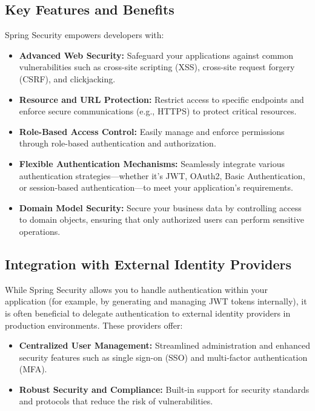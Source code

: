 \subsection*{Key Features and Benefits}
Spring Security empowers developers with:
\begin{itemize}
    \item \textbf{Advanced Web Security:} Safeguard your applications against common vulnerabilities such as cross-site scripting (XSS), cross-site request forgery (CSRF), and clickjacking.
    \item \textbf{Resource and URL Protection:} Restrict access to specific endpoints and enforce secure communications (e.g., HTTPS) to protect critical resources.
    \item \textbf{Role-Based Access Control:} Easily manage and enforce permissions through role-based authentication and authorization.
    \item \textbf{Flexible Authentication Mechanisms:} Seamlessly integrate various authentication strategies—whether it’s JWT, OAuth2, Basic Authentication, or session-based authentication—to meet your application’s requirements.
    \item \textbf{Domain Model Security:} Secure your business data by controlling access to domain objects, ensuring that only authorized users can perform sensitive operations.
\end{itemize}

\subsection*{Integration with External Identity Providers}
While Spring Security allows you to handle authentication within your application (for example, by generating and managing JWT tokens internally), it is often beneficial to delegate authentication to external identity providers in production environments. These providers offer:
\begin{itemize}
    \item \textbf{Centralized User Management:} Streamlined administration and enhanced security features such as single sign-on (SSO) and multi-factor authentication (MFA).
    \item \textbf{Robust Security and Compliance:} Built-in support for security standards and protocols that reduce the risk of vulnerabilities.
\end{itemize}

